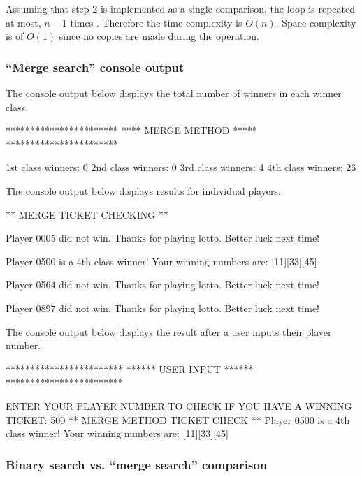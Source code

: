 Assuming that step 2 is implemented as a single comparison, the loop is repeated at most, $n - 1$ times \citep[p. 48 - 49]{Watt2001}. Therefore the time complexity is $O(n)$. Space complexity is of $O(1)$ since no copies are made during the operation.

\subsubsection{``Merge search'' console output}

The console output below displays the total number of winners in each winner class.
\\
\begin{consolecode}
***********************
**** MERGE METHOD *****
***********************

1st class winners: 0
2nd class winners: 0
3rd class winners: 4
4th class winners: 26
\end{consolecode}

\noindent
The console output below displays results for individual players.
\\
\begin{consolecode}
** MERGE TICKET CHECKING **

Player 0005 did not win. Thanks for playing lotto. 
Better luck next time!

Player 0500 is a 4th class winner!
Your winning numbers are: [11][33][45]

Player 0564 did not win. Thanks for playing lotto. 
Better luck next time!

Player 0897 did not win. Thanks for playing lotto. 
Better luck next time!
\end{consolecode}

\noindent
The console output below displays the result after a user inputs their player number.
\\
\begin{consolecode}
************************
****** USER INPUT ******
************************

ENTER YOUR PLAYER NUMBER TO CHECK IF YOU HAVE A WINNING TICKET:
500
** MERGE METHOD TICKET CHECK **
Player 0500 is a 4th class winner!
Your winning numbers are: [11][33][45]
\end{consolecode}

\newpage
\subsubsection{Binary search vs. ``merge search'' comparison}

